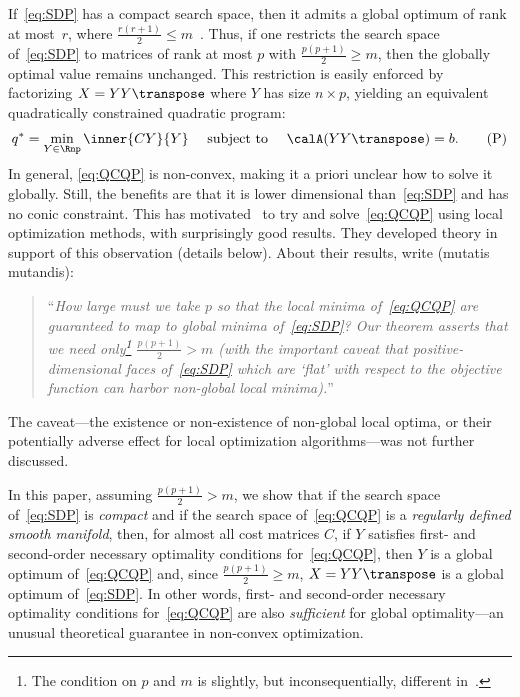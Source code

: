 \documentclass{article}
\newcommand{\1}{\mathbf{1}}
\begin{document}
If~\eqref{eq:SDP} has a compact search space, then it admits a global optimum of rank at most~$r$, where $\frac{r(r+1)}{2} \leq m$~\citep{pataki1998rank,barvinok1995problems}.
Thus, if one restricts the search space of~\eqref{eq:SDP} to matrices of rank at most $p$ with $\frac{p(p+1)}{2} \geq m$, then the  globally  optimal value remains unchanged. This restriction is easily enforced by factorizing $X = YY\transpose$ where $Y$ has size $n\times p$, yielding an equivalent quadratically constrained quadratic program:
\begin{align}
q^* = \min_{Y\in\Rnp} \inner{CY}{Y} \quad \textrm{ subject to } \quad \calA(YY\transpose) = b.
\tag{P}
\label{eq:QCQP}
\end{align}
In general, \eqref{eq:QCQP} is non-convex, making it a priori unclear how to solve it globally. Still, the benefits are that it is lower dimensional than~\eqref{eq:SDP} and has no conic constraint.
This has motivated~\citet{sdplr,burer2005local} to try and solve~\eqref{eq:QCQP} using local optimization methods, with surprisingly good results. They developed theory in support of this observation (details below). About their results, %
\citet[\S3]{burer2005local} write (mutatis mutandis):
\begin{quote}
	``\emph{How large must we take $p$ so that the local minima of~\eqref{eq:QCQP} are guaranteed to map to global minima of~\eqref{eq:SDP}? Our theorem asserts that we need only\footnote{The condition on $p$ and $m$ is slightly, but inconsequentially, different in~\citep{burer2005local}.} $\frac{p(p+1)}{2} > m$ (with the important caveat that positive-dimensional faces of~\eqref{eq:SDP} which are `flat' with respect to the objective function can harbor non-global local minima).}''
\end{quote}
The caveat---the existence or non-existence of non-global local optima, or their potentially adverse effect for local optimization algorithms---was not further discussed.

In this paper, assuming $\frac{p(p+1)}{2} > m$, we show that if the search space of~\eqref{eq:SDP} is \emph{compact} and if the search space of~\eqref{eq:QCQP} is a \emph{regularly defined smooth manifold}, then, for almost all cost matrices $C$,
if $Y$ satisfies first- and second-order necessary optimality conditions for~\eqref{eq:QCQP}, then $Y$ is a global optimum of~\eqref{eq:QCQP} and, since $\frac{p(p+1)}{2} \geq m$, $X = YY\transpose$ is a global optimum of~\eqref{eq:SDP}. In other words,
first- and second-order necessary optimality conditions for~\eqref{eq:QCQP} are also \emph{sufficient} for global optimality---an unusual theoretical guarantee in non-convex optimization.
\end{document}
